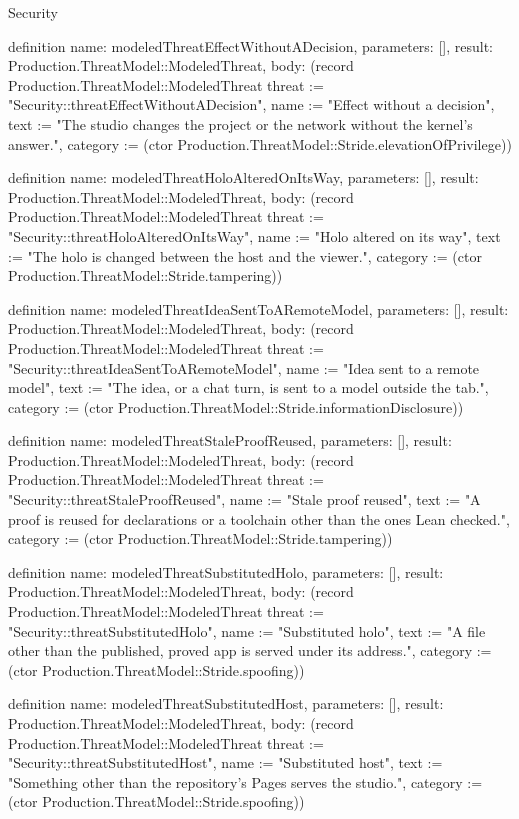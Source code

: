 \begin{lexlean}{Security}
\begin{semanticmodule}
definition{
  name: modeledThreatEffectWithoutADecision,
  parameters: [],
  result: Production.ThreatModel::ModeledThreat,
  body: (record Production.ThreatModel::ModeledThreat {threat := "Security::threatEffectWithoutADecision", name := "Effect without a decision", text := "The studio changes the project or the network without the kernel's answer.", category := (ctor Production.ThreatModel::Stride.elevationOfPrivilege)})
}

definition{
  name: modeledThreatHoloAlteredOnItsWay,
  parameters: [],
  result: Production.ThreatModel::ModeledThreat,
  body: (record Production.ThreatModel::ModeledThreat {threat := "Security::threatHoloAlteredOnItsWay", name := "Holo altered on its way", text := "The holo is changed between the host and the viewer.", category := (ctor Production.ThreatModel::Stride.tampering)})
}

definition{
  name: modeledThreatIdeaSentToARemoteModel,
  parameters: [],
  result: Production.ThreatModel::ModeledThreat,
  body: (record Production.ThreatModel::ModeledThreat {threat := "Security::threatIdeaSentToARemoteModel", name := "Idea sent to a remote model", text := "The idea, or a chat turn, is sent to a model outside the tab.", category := (ctor Production.ThreatModel::Stride.informationDisclosure)})
}

definition{
  name: modeledThreatStaleProofReused,
  parameters: [],
  result: Production.ThreatModel::ModeledThreat,
  body: (record Production.ThreatModel::ModeledThreat {threat := "Security::threatStaleProofReused", name := "Stale proof reused", text := "A proof is reused for declarations or a toolchain other than the ones Lean checked.", category := (ctor Production.ThreatModel::Stride.tampering)})
}

definition{
  name: modeledThreatSubstitutedHolo,
  parameters: [],
  result: Production.ThreatModel::ModeledThreat,
  body: (record Production.ThreatModel::ModeledThreat {threat := "Security::threatSubstitutedHolo", name := "Substituted holo", text := "A file other than the published, proved app is served under its address.", category := (ctor Production.ThreatModel::Stride.spoofing)})
}

definition{
  name: modeledThreatSubstitutedHost,
  parameters: [],
  result: Production.ThreatModel::ModeledThreat,
  body: (record Production.ThreatModel::ModeledThreat {threat := "Security::threatSubstitutedHost", name := "Substituted host", text := "Something other than the repository's Pages serves the studio.", category := (ctor Production.ThreatModel::Stride.spoofing)})
}


\end{semanticmodule}
\end{lexlean}
